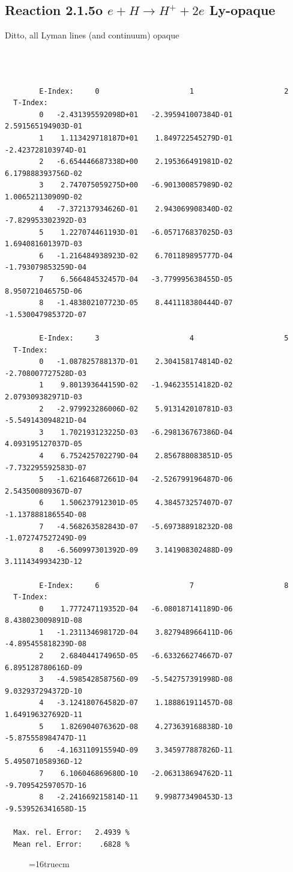 \documentclass[12pt,dvips]{article}
\begin{document}
\subsection{
Reaction 2.1.5o $ e + H \rightarrow H^+ + 2e $  Ly-opaque}


Ditto, all Lyman lines (and continuum) opaque


\begin{small}\begin{verbatim}



        E-Index:     0                     1                     2
  T-Index:
        0   -2.431395592098D+01   -2.395941007384D-01    2.591565194903D-01
        1    1.113429718187D+01    1.849722545279D-01   -2.423728103974D-01
        2   -6.654446687338D+00    2.195366491981D-02    6.179888393756D-02
        3    2.747075059275D+00   -6.901300857989D-02    1.006521130909D-02
        4   -7.372137934626D-01    2.943069908340D-02   -7.829953302392D-03
        5    1.227074461193D-01   -6.057176837025D-03    1.694081601397D-03
        6   -1.216484938923D-02    6.701189895777D-04   -1.793079853259D-04
        7    6.566484532457D-04   -3.779995638455D-05    8.950721046575D-06
        8   -1.483802107723D-05    8.441118380444D-07   -1.530047985372D-07

        E-Index:     3                     4                     5
  T-Index:
        0   -1.087825788137D-01    2.304158174814D-02   -2.708007727528D-03
        1    9.801393644159D-02   -1.946235514182D-02    2.079309382971D-03
        2   -2.979923286006D-02    5.913142010781D-03   -5.549143094821D-04
        3    1.702193123225D-03   -6.298136767386D-04    4.093195127037D-05
        4    6.752425702279D-04    2.856788083851D-05   -7.732295592583D-07
        5   -1.621646872661D-04   -2.526799196487D-06    2.543500809367D-07
        6    1.506237912301D-05    4.384573257407D-07   -1.137888186554D-08
        7   -4.568263582843D-07   -5.697388918232D-08   -1.072747527249D-09
        8   -6.560997301392D-09    3.141908302488D-09    3.111434993423D-12

        E-Index:     6                     7                     8
  T-Index:
        0    1.777247119352D-04   -6.080187141189D-06    8.438023009891D-08
        1   -1.231134698172D-04    3.827948966411D-06   -4.895455818239D-08
        2    2.684044174965D-05   -6.633266274667D-07    6.895128780616D-09
        3   -4.598542858756D-09   -5.542757391998D-08    9.032937294372D-10
        4   -3.124180764582D-07    1.188861911457D-08    1.649196327692D-11
        5    1.826904076362D-08    4.273639168838D-10   -5.875558984747D-11
        6   -4.163110915594D-09    3.345977887826D-11    5.495071058936D-12
        7    6.106046869680D-10   -2.063138694762D-11   -9.709542597057D-16
        8   -2.241669215814D-11    9.998773490453D-13   -9.539526341658D-15

  Max. rel. Error:   2.4939 %
  Mean rel. Error:    .6828 %

\end{verbatim}\end{small}
\begin{figure} \label{2.1.5io}
\epsfxsize=16truecm
\end{figure}
\newpage
\end{document}
